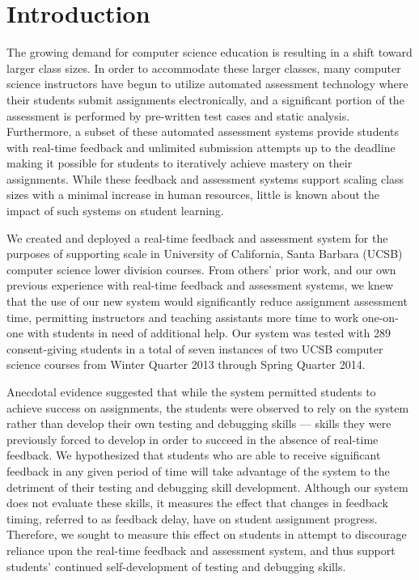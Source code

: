 \section{Introduction}
The growing demand for computer science education is resulting in a shift
toward larger class sizes. In order to accommodate these larger classes, many
computer science instructors have begun to utilize automated assessment
technology where their students submit assignments electronically, and a
significant portion of the assessment is performed by pre-written test cases
and static analysis. Furthermore, a subset of these automated assessment
systems provide students with real-time feedback and unlimited submission
attempts up to the deadline making it possible for students to iteratively
achieve mastery on their assignments. While these feedback and assessment
systems support scaling class sizes with a minimal increase in human resources,
little is known about the impact of such systems on student learning.

We created and deployed a real-time feedback and assessment system for the
purposes of supporting scale in University of California, Santa Barbara (UCSB)
computer science lower division courses. From others' prior work, and our own
previous experience with real-time feedback and assessment systems, we knew
that the use of our new system would significantly reduce assignment assessment
time, permitting instructors and teaching assistants more time to work
one-on-one with students in need of additional help. Our system was tested with
289 consent-giving students in a total of seven instances of two UCSB computer
science courses from Winter Quarter 2013 through Spring Quarter 2014.

Anecdotal evidence suggested that while the system permitted students to
achieve success on assignments, the students were observed to rely on the
system rather than develop their own testing and debugging skills --- skills
they were previously forced to develop in order to succeed in the absence of
real-time feedback. We hypothesized that students who are able to receive
significant feedback in any given period of time will take advantage of the
system to the detriment of their testing and debugging skill
development. Although our system does not evaluate these skills, it measures
the effect that changes in feedback timing, referred to as feedback delay, have
on student assignment progress. Therefore, we sought to measure this effect on
students in attempt to discourage reliance upon the real-time feedback and
assessment system, and thus support students' continued self-development of
testing and debugging skills.

